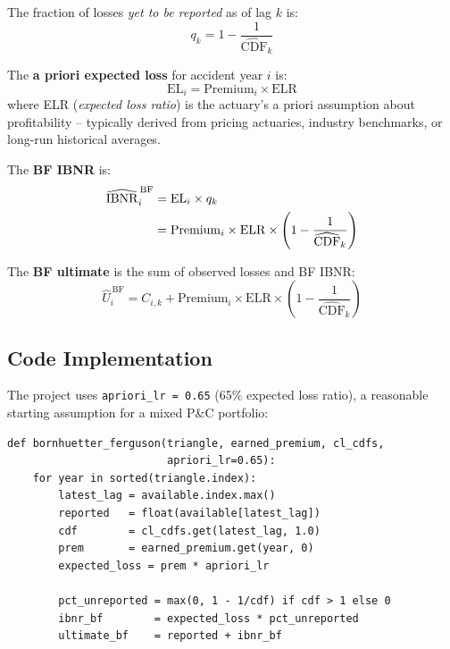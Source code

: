 The fraction of losses \emph{yet to be reported} as of lag $k$ is:
\begin{equation}
  q_k = 1 - \frac{1}{\widehat{\mathrm{CDF}}_k}
  \label{eq:pct-unreported}
\end{equation}

The \textbf{a priori expected loss} for accident year $i$ is:
\begin{equation}
  \mathrm{EL}_i = \mathrm{Premium}_i \times \mathrm{ELR}
  \label{eq:expected-loss}
\end{equation}
where ELR (\emph{expected loss ratio}) is the actuary's a priori assumption
about profitability -- typically derived from pricing actuaries, industry
benchmarks, or long-run historical averages.

The \textbf{BF IBNR} is:
\begin{align}
  \widehat{\mathrm{IBNR}}_i^{\,\mathrm{BF}}
    &= \mathrm{EL}_i \times q_k \notag \\
    &= \mathrm{Premium}_i \times \mathrm{ELR}
       \times \left(1 - \frac{1}{\widehat{\mathrm{CDF}}_k}\right)
  \label{eq:bf-ibnr}
\end{align}

The \textbf{BF ultimate} is the sum of observed losses and BF IBNR:
\begin{equation}
  \hat{U}_i^{\,\mathrm{BF}} = C_{i,k}
    + \mathrm{Premium}_i \times \mathrm{ELR}
      \times \left(1 - \frac{1}{\widehat{\mathrm{CDF}}_k}\right)
  \label{eq:bf-ultimate}
\end{equation}

\subsection{Code Implementation}

The project uses \texttt{apriori\_lr = 0.65} (65\% expected loss ratio),
a reasonable starting assumption for a mixed P\&C portfolio:

\begin{lstlisting}[style=python, caption={Bornhuetter-Ferguson (\texttt{04\_compute\_reserves.py}, lines 159--177)}]
def bornhuetter_ferguson(triangle, earned_premium, cl_cdfs,
                         apriori_lr=0.65):
    for year in sorted(triangle.index):
        latest_lag = available.index.max()
        reported   = float(available[latest_lag])
        cdf        = cl_cdfs.get(latest_lag, 1.0)
        prem       = earned_premium.get(year, 0)
        expected_loss = prem * apriori_lr

        pct_unreported = max(0, 1 - 1/cdf) if cdf > 1 else 0
        ibnr_bf        = expected_loss * pct_unreported
        ultimate_bf    = reported + ibnr_bf
\end{lstlisting}

